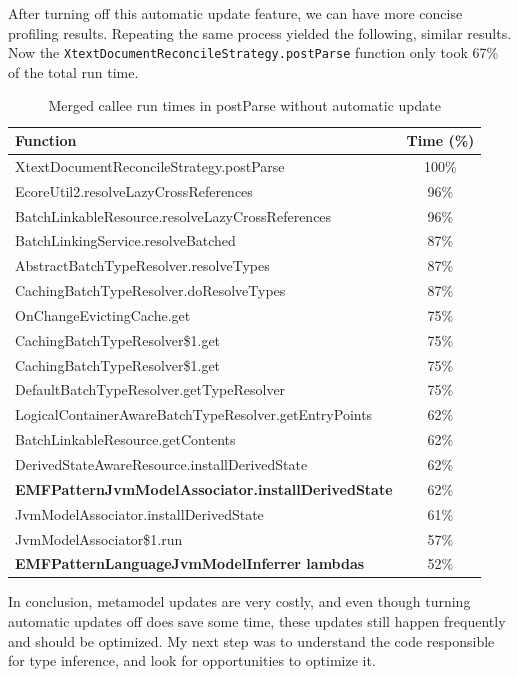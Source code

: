 \documentclass[11pt,a4paper,oneside]{report}
\begin{document}
After turning off this automatic update feature, we can have more concise
profiling results. Repeating the same process yielded the following, similar
results. Now the \texttt{XtextDocumentReconcileStrategy.postParse} function only
took 67\% of the total run time.

\begin{table}[ht]
    \footnotesize
    \centering
    \begin{tabular}{ l c }
        \toprule
        Function & Time (\%) \\
        \midrule
        XtextDocumentReconcileStrategy.postParse & 100\% \\
        EcoreUtil2.resolveLazyCrossReferences & 96\% \\
        BatchLinkableResource.resolveLazyCrossReferences & 96\% \\
        BatchLinkingService.resolveBatched & 87\% \\
        AbstractBatchTypeResolver.resolveTypes & 87\% \\
        CachingBatchTypeResolver.doResolveTypes & 87\% \\
        OnChangeEvictingCache.get & 75\% \\
        CachingBatchTypeResolver\$1.get & 75\% \\
        CachingBatchTypeResolver\$1.get & 75\% \\
        DefaultBatchTypeResolver.getTypeResolver & 75\% \\
        LogicalContainerAwareBatchTypeResolver.getEntryPoints & 62\% \\
        BatchLinkableResource.getContents & 62\% \\
        DerivedStateAwareResource.installDerivedState & 62\% \\
        \textbf{EMFPatternJvmModelAssociator.installDerivedState} & 62\% \\
        JvmModelAssociator.installDerivedState & 61\% \\
        JvmModelAssociator\$1.run & 57\% \\
        \textbf{EMFPatternLanguageJvmModelInferrer lambdas} & 52\% \\
        \bottomrule
    \end{tabular}
    \caption{Merged callee run times in postParse without automatic update}
    \label{tab:postparse-no-auto-update}
\end{table}

In conclusion, metamodel updates are very costly, and even though turning
automatic updates off does save some time, these updates still happen
frequently and should be optimized. My next step was to understand the code
responsible for type inference, and look for opportunities to optimize it.
\end{document}
